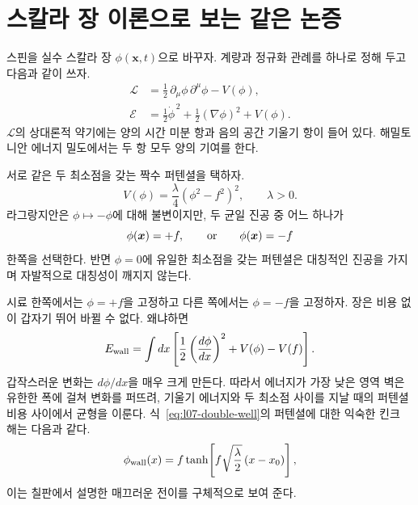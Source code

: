 \section{스칼라 장 이론으로 보는 같은 논증}

스핀을 실수 스칼라 장 \(\phi(\bm{x},t)\)으로 바꾸자. 계량과 정규화 관례를 하나로 정해 두고 다음과 같이 쓰자.
\begin{equation}
\begin{aligned}
  \mathcal L
  &=\frac12\,\partial_\mu\phi\,\partial^\mu\phi-V(\phi),
  \\
  \mathcal E
  &=\frac12\dot\phi^{\,2}+\frac12(\nabla\phi)^2+V(\phi).
\end{aligned}
  \label{eq:l07-real-scalar}
\end{equation}
\(\mathcal L\)의 상대론적 약기에는 양의 시간 미분 항과 음의 공간 기울기 항이 들어 있다. 해밀토니안 에너지 밀도에서는 두 항 모두 양의 기여를 한다.

서로 같은 두 최소점을 갖는 짝수 퍼텐셜을 택하자.
\begin{equation}
  V(\phi)=\frac{\lambda}{4}\left(\phi^2-f^2\right)^2,
  \qquad \lambda>0.
  \label{eq:l07-double-well}
\end{equation}
라그랑지안은 \(\phi\mapsto-\phi\)에 대해 불변이지만, 두 균일 진공 중 어느 하나가
\begin{equation}
  \phi(\bm{x})=+f,
  \qquad\hbox{or}\qquad
  \phi(\bm{x})=-f
\end{equation}
한쪽을 선택한다. 반면 \(\phi=0\)에 유일한 최소점을 갖는 퍼텐셜은 대칭적인 진공을 가지며 자발적으로 대칭성이 깨지지 않는다.

시료 한쪽에서는 \(\phi=+f\)을 고정하고 다른 쪽에서는 \(\phi=-f\)을 고정하자. 장은 비용 없이 갑자기 뛰어 바뀔 수 없다. 왜냐하면
\begin{equation}
  E_{\rm wall}
  =\int dx\left[
      \frac12\left(\frac{d\phi}{dx}\right)^2+V(\phi)-V(f)
    \right].
  \label{eq:l07-wall-energy}
\end{equation}
갑작스러운 변화는 \(d\phi/dx\)을 매우 크게 만든다. 따라서 에너지가 가장 낮은 영역 벽은 유한한 폭에 걸쳐 변화를 퍼뜨려, 기울기 에너지와 두 최소점 사이를 지날 때의 퍼텐셜 비용 사이에서 균형을 이룬다. 식~\eqref{eq:l07-double-well}의 퍼텐셜에 대한 익숙한 킨크 해는 다음과 같다.
\begin{equation}
  \phi_{\rm wall}(x)
  =f\tanh\!\left[f\sqrt{\frac{\lambda}{2}}\,(x-x_0)\right],
  \label{eq:l07-kink}
\end{equation}
이는 칠판에서 설명한 매끄러운 전이를 구체적으로 보여 준다.

